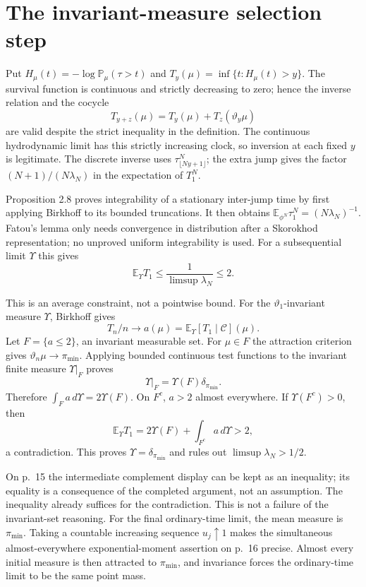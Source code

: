 \documentclass[10pt]{article}
\begin{document}
\section*{The invariant-measure selection step}
Put \(H_\mu(t)=-\log\mathbb P_\mu(\tau>t)\) and \(T_y(\mu)=\inf\{t:H_\mu(t)>y\}\). The survival function is continuous and strictly decreasing to zero; hence the inverse relation and the cocycle \[T_{y+z}(\mu)=T_y(\mu)+T_z(\vartheta_y\mu)\] are valid despite the strict inequality in the definition. The continuous hydrodynamic limit has this strictly increasing clock, so inversion at each fixed \(y\) is legitimate. The discrete inverse uses \(\tau^N_{\lfloor Ny+1\rfloor}\); the extra jump gives the factor \((N+1)/(N\lambda_N)\) in the expectation of \(T_1^N\).\par
Proposition 2.8 proves integrability of a stationary inter-jump time by first applying Birkhoff to its bounded truncations. It then obtains \(\mathbb E_{\phi^N}\tau_1^N=(N\lambda_N)^{-1}\). Fatou’s lemma only needs convergence in distribution after a Skorokhod representation; no unproved uniform integrability is used. For a subsequential limit \(\Upsilon\) this gives \[\mathbb E_\Upsilon T_1
 \leq\frac1{\limsup\lambda_N}\leq2.\]\par
This is an average constraint, not a pointwise bound. For the \(\vartheta_1\)-invariant measure \(\Upsilon\), Birkhoff gives \[T_n/n\longrightarrow a(\mu)=
 \mathbb E_\Upsilon[T_1\mid\mathcal C](\mu).\] Let \(F=\{a\leq2\}\), an invariant measurable set. For \(\mu\in F\) the attraction criterion gives \(\vartheta_n\mu\to\pi_{\min}\). Applying bounded continuous test functions to the invariant finite measure \(\Upsilon|_F\) proves \[\Upsilon|_F=\Upsilon(F)\delta_{\pi_{\min}}.\] Therefore \(\int_Fa\,d\Upsilon=2\Upsilon(F)\). On \(F^c\), \(a>2\) almost everywhere. If \(\Upsilon(F^c)>0\), then \[\mathbb E_\Upsilon T_1
 =2\Upsilon(F)+\int_{F^c}a\,d\Upsilon>2,\] a contradiction. This proves \(\Upsilon=\delta_{\pi_{\min}}\) and rules out \(\limsup\lambda_N>1/2\).\par
On p. 15 the intermediate complement display can be kept as an inequality; its equality is a consequence of the completed argument, not an assumption. The inequality already suffices for the contradiction. This is not a failure of the invariant-set reasoning. For the final ordinary-time limit, the mean measure is \(\pi_{\min}\). Taking a countable increasing sequence \(u_j\uparrow1\) makes the simultaneous almost-everywhere exponential-moment assertion on p. 16 precise. Almost every initial measure is then attracted to \(\pi_{\min}\), and invariance forces the ordinary-time limit to be the same point mass.\par
\end{document}
